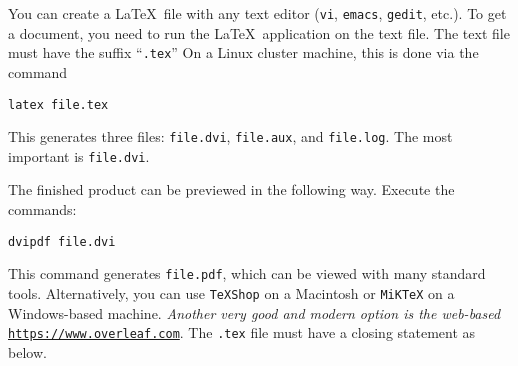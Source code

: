 \documentclass{article}
\begin{document}
\medskip
{}
\medskip

You can create a \LaTeX~file with any text editor ({\tt vi}, {\tt emacs}, {\tt gedit},
etc.).
To get a document, you need to run the \LaTeX~application
on the text file.  The text file must have the suffix ``{\tt .tex}''
On a Linux cluster machine, this is done via the command

\medskip
{\tt latex file.tex}

\medskip
\noindent
This generates three files: {\tt file.dvi}, {\tt file.aux},
and {\tt file.log}.  The most important is {\tt file.dvi}.

\medskip
\noindent
The finished product can be previewed in the following way.
Execute the commands:

\medskip

{\tt dvipdf file.dvi}\hspace{1.9in}{\em Linux System}

\medskip
\noindent
This command generates {\tt file.pdf}, which can be viewed with many standard tools.
Alternatively, you can use {\tt TeXShop} on a Macintosh or {\tt MiKTeX} on a Windows-based machine. {\em Another very good and modern option is the web-based} \href{https://www.overleaf.com}{\tt https://www.overleaf.com}.
The {\tt .tex} file must have a closing statement as
below.
\end{document}
